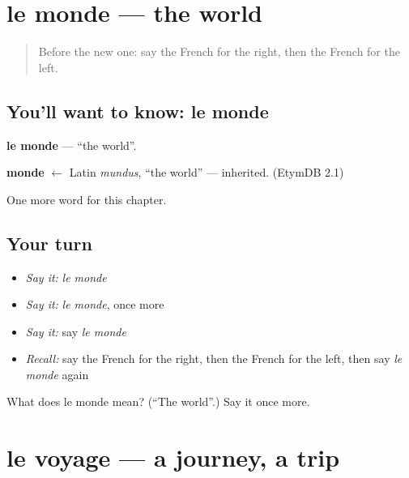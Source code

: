 \section[le monde]{le monde — the world}

\label{lesson:FR-C110-monde}



\begin{quote}
Before the new one: say the French for the right, then the French for the left.
\end{quote}

\subsection*{You'll want to know: le monde}
\textbf{le monde} — \textquotedblleft{}the world\textquotedblright{}.

\begin{cousinweb}
\textbf{monde} $\leftarrow$ Latin \emph{mundus}, \textquotedblleft{}the world\textquotedblright{} — inherited. (EtymDB 2.1)
\end{cousinweb}

\begin{grammarlens}[title={What you've built}]
One more word for this chapter.
\end{grammarlens}

\subsection*{Your turn}
\begin{itemize}
\raggedright
  \item \emph{Say it:} \emph{le monde}
  \item \emph{Say it:} \emph{le monde}, once more
  \item \emph{Say it:} say \emph{le monde}
  \item \emph{Recall:} say the French for the right, then the French for the left, then say \emph{le monde} again
\end{itemize}

\begin{tcolorbox}[breakable,colback=teal!4,colframe=teal!35!black,title={Before you move on}]
What does le monde mean? (\textquotedblleft{}The world\textquotedblright{}.) Say it once more.
\end{tcolorbox}
\section[le voyage]{le voyage — a journey, a trip}

